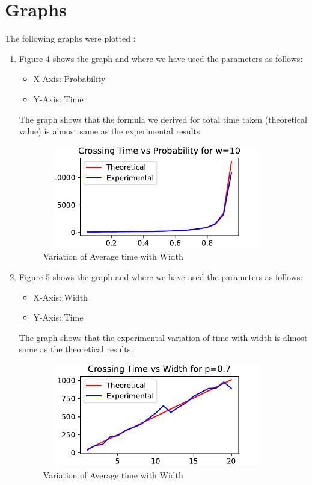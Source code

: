 \documentclass[12pt]{article}
\begin{document}
\section{Graphs}
The following graphs were plotted : 
\begin{enumerate}
    \item Figure 4 shows the graph and where we have used the parameters as follows:
   \begin{itemize}
        \item X-Axis: Probability
        \item Y-Axis: Time
   \end{itemize}

The graph shows that the formula we derived for total time taken (theoretical value) is almost same as the experimental results.
\begin{center}
    \begin{figure}[h]
        \centering
        \includegraphics[width=10cm, height=4.5cm]{TvsP.pdf}
        \caption{Variation of Average time with Width}
    \end{figure}
\end{center}

\vspace{50em}
\item Figure 5 shows the graph and where we have used the parameters as follows:
   \begin{itemize}
        \item X-Axis: Width
        \item Y-Axis: Time
   \end{itemize}

The graph shows that the experimental variation of time with width is almost same as the theoretical results.
\begin{center}
    \begin{figure}[h]
        \centering
        \includegraphics[width=10cm, height=4.5cm]{TvsW.pdf}
        \caption{Variation of Average time with Width}
    \end{figure}
\end{center}


\end{enumerate}
\end{document}
